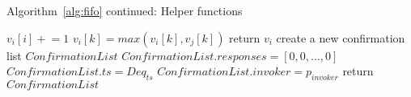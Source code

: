 \documentclass[a4paper,anonymous,USenglish]{lipics-v2021} %
\theoremstyle{definition}
\newcommand{\red}[1]{\textcolor{red}{#1}} %
\newcommand{\pluseq}{\mathrel{+}=}
\begin{document}
\begin{algorithm}
  \caption{Algorithm~\ref{alg:fifo} continued: Helper functions}
  \begin{algorithmic}[1]
    
%
%
        \State $v_i[i] \pluseq 1$
      \Else
          \State $v_i[k] = max(v_i[k], v_j[k])$
        \EndFor
      \EndIf
      \State return $v_i$
    \EndFunction
%
      \State create a new confirmation list $ConfirmationList$
      \State $ConfirmationList.responses = [0,0,...,0]$ 
      \State $ConfirmationList.ts = Deq_{ts}$ 
      \State $ConfirmationList.invoker = p_{invoker}$ 
      \State return $ConfirmationList$
    \EndFunction
  \end{algorithmic}
\end{algorithm}


\end{document}
